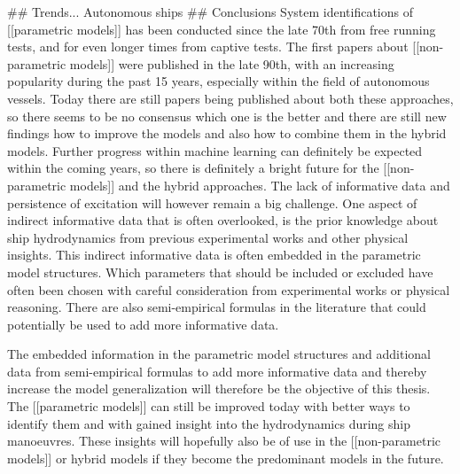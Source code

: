 ## Trends...
Autonomous ships
## Conclusions
System identifications of [[parametric models]] has been conducted since the late 70th from free running tests, and for even longer times from captive tests. The first papers about [[non-parametric models]] were published in the late 90th, with an increasing popularity during the past 15 years, especially within the field of autonomous vessels. Today there are still papers being published about both these approaches, so there seems to be no consensus which one is the better and there are still new findings how to improve the models and also how to combine them in the hybrid models.
Further progress within machine learning can definitely be expected within the coming years, so there is definitely a bright future for the [[non-parametric models]] and the hybrid approaches. The lack of informative data and persistence of excitation will however remain a big challenge. One aspect of indirect informative data that is often overlooked, is the prior knowledge about ship hydrodynamics from previous experimental works and other physical insights. This indirect informative data is often embedded in the parametric model structures. Which parameters that should be included or excluded have often been chosen with careful consideration from experimental works or physical reasoning. There are also semi-empirical formulas in the literature that could potentially be used to add more informative data. 

The embedded information in the parametric model structures and additional data from semi-empirical formulas to add more informative data and thereby increase the model generalization will therefore be the objective of this thesis.         
The [[parametric models]] can still be improved today with better ways to identify them and with gained insight into the hydrodynamics during ship manoeuvres. These insights will hopefully also be of use in the [[non-parametric models]] or hybrid models if they become the predominant models in the future.
